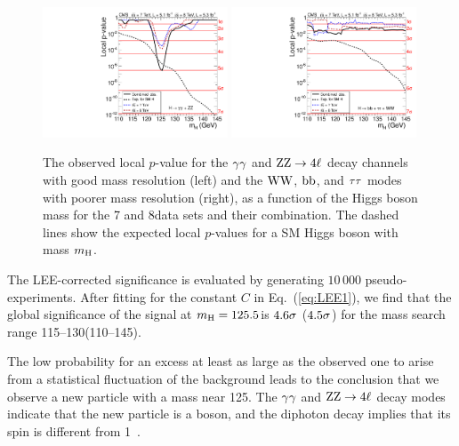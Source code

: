 \documentclass[11pt,twoside,a4paper,cmspaper,final,collab]{cms-tdr}
\begin{document}
\begin{figure} %
\centering
\includegraphics[width=0.49\textwidth]{figures/comb/sqr_pvala_all_energy_hires} \hfill
\includegraphics[width=0.49\textwidth]{figures/comb/sqr_pvala_all_energy_lowres}
\caption{
The observed local $p$-value for the $\gamma\gamma$ and $\mathrm{Z}\mathrm{Z} \to 4\ell$ decay channels with good  mass resolution (left)
and the  $\mathrm{W}\mathrm{W}$, $\mathrm{b}\mathrm{b}$, and $\tau\tau$ modes with poorer mass resolution (right), as a function of the
Higgs boson mass for the 7 and 8\TeV data sets and their combination.
The dashed lines show the expected local $p$-values for
a SM Higgs boson with  mass $m_{\mathrm{H}}$.
    }
\label{fig:pvalue_subcomb}
\end{figure}


The LEE-corrected significance
is evaluated by generating $10\,000$ pseudo-experiments.  After fitting for
the constant $C$ in Eq.~(\ref{eq:LEE1}),
we find that the global significance of the signal at $m_{\mathrm{H}}=125.5$\GeV is
$4.6 \sigma$ ($4.5 \sigma$) for the mass search
range 115--130\GeV (110--145\GeV).

The low probability for an excess at least as large as the observed one
to arise from a statistical fluctuation of the background leads  to the conclusion that
we observe a new particle with a mass near 125\GeV.
The  $\gamma\gamma$ and $\mathrm{Z}\mathrm{Z} \to 4\ell$ decay modes indicate that the new particle is a boson, and
the diphoton decay implies that its spin is different from 1~\cite{Landau,Yang}.
\end{document}
